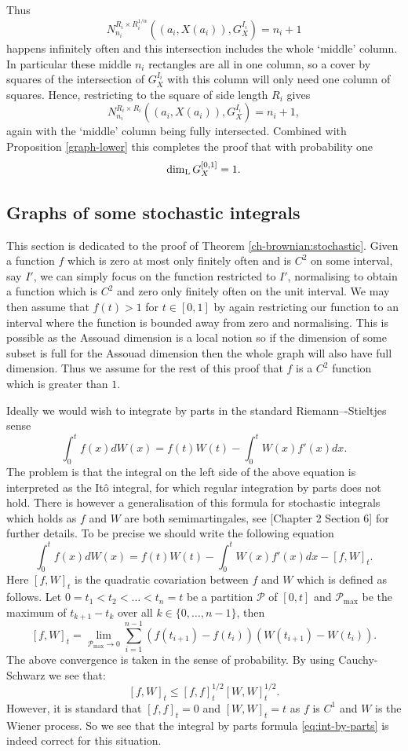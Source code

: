 Thus 
\[
N_{n_i}^{R_i \times R_i^{1/\alpha}}\left((a_i,X(a_i)), G_X^{I_i}\right) = n_i + 1
\]
happens infinitely often and this intersection includes the whole `middle' column. In particular these middle $n_i$ rectangles are all in one column, so a cover by squares of the intersection of $G_X^{I_i}$ with this column will only need one column of squares. Hence, restricting to the square of side length $R_i$ gives
\[
N_{n_i}^{R_i \times R_i}\left((a_i,X(a_i)), G_X^{I_i}\right) = n_i + 1,
\]
again with the `middle' column being fully intersected. Combined with Proposition \ref{graph-lower} this completes the proof that with probability one 
\[
\dim_{\textup{L}} G_X^{[0,1]} = 1.
\]



\subsection{Graphs of some stochastic integrals}

    This section is dedicated to the proof of Theorem \ref{ch-brownian:stochastic}.	Given a function $f$ which is zero at most only finitely often and is $C^2$ on some interval, say $I'$, we can simply focus on the function restricted to $I'$, normalising to obtain a function which is $C^2$ and zero only finitely often on the unit interval. We may then assume that $f(t)>1$ for $t\in [0,1]$ by again restricting our function to an interval where the function is bounded away from zero and normalising. This is possible as the Assouad dimension is a local notion so if the dimension of some subset is full for the Assouad dimension then the whole graph will also have full dimension. Thus we assume for the rest of this proof that $f$ is a $C^2$ function which is greater than $1$.
	
	Ideally we would wish to integrate by parts in the standard Riemann–-Stieltjes sense
	\begin{equation}
	    \int_{0}^{t}f(x)dW(x)=f(t)W(t)-\int_{0}^{t}W(x)f'(x)dx.\label{eq:int-by-parts}
	\end{equation}
	The problem is that the integral on the left side of the above equation is interpreted as the It\^{o} integral, for which regular integration by parts does not hold. There is however a generalisation of this formula for stochastic integrals which holds as $f$ and $W$ are both semimartingales, see \cite{protter}[Chapter 2 Section 6] for further details. To be precise we should write the following equation
	\[
	\int_{0}^{t}f(x)dW(x)=f(t)W(t)-\int_{0}^{t}W(x)f'(x)dx-[f,W]_t.
	\]
	Here $[f,W]_t$ is the quadratic covariation between $f$ and $W$ which is defined as follows. Let $0=t_1<t_2<\dots<t_n=t$ be a partition $\mathcal{P}$ of $[0,t]$ and $\mathcal{P}_{\max}$ be the maximum of $t_{k+1}-t_k$ over all $k\in\{0,\dots,n-1\}$, then
	\[
	[f,W]_t=\lim_{\mathcal{P}_{\max}\rightarrow 0} \sum_{i=1}^{n-1} (f(t_{i+1})-f(t_{i}))(W(t_{i+1})-W(t_i)).
	\]
	The above convergence is taken in the sense of probability. By using Cauchy-Schwarz we see that:
	\[
	[f,W]_t\leq [f,f]^{1/2}_t[W,W]^{1/2}_t.
	\]
	However, it is standard that $[f,f]_t=0$ and $[W,W]_t=t$ as $f$ is $C^1$ and $W$ is the Wiener process. So we see that the integral by parts formula \eqref{eq:int-by-parts} is indeed correct for this situation. 
	
